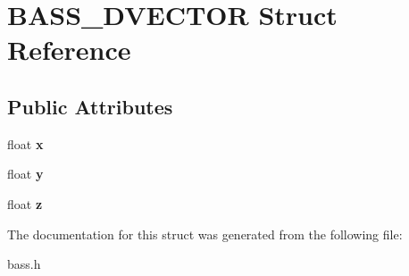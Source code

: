 \section{B\+A\+S\+S\+\_\+D\+V\+E\+C\+T\+O\+R Struct Reference}
\label{struct_b_a_s_s__3_d_v_e_c_t_o_r}
\subsection*{Public Attributes}
\begin{DoxyCompactItemize}
\item 
float {\bfseries x}\label{struct_b_a_s_s__3_d_v_e_c_t_o_r_af3d4cc65c06996e789da1c5c295039b1}

\item 
float {\bfseries y}\label{struct_b_a_s_s__3_d_v_e_c_t_o_r_a4284c81914926f579e3e1dde7ad06926}

\item 
float {\bfseries z}\label{struct_b_a_s_s__3_d_v_e_c_t_o_r_a183f698058d7394590cba43e0735a110}

\end{DoxyCompactItemize}


The documentation for this struct was generated from the following file\+:\begin{DoxyCompactItemize}
\item 
bass.\+h\end{DoxyCompactItemize}
